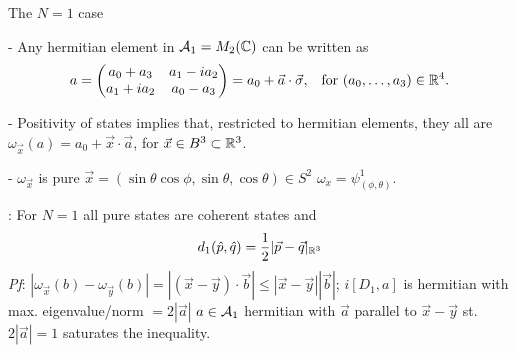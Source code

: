 \begin{frame}{The $N = 1$ case} %

- Any hermitian element in $\mathcal A_1 = M_2(\mathbb C)$ can be written as
\begin{align*}
    a &= \begin{pmatrix} a_0 + a_3 & a_1 - i a_2 \\ a_1 + i a_2 & a_0 - a_3  \end{pmatrix}= a_0 + \vec a \cdot \vec \sigma, & \text{for $(a_0, \dots, a_3) \in \mathbb R^4$.}
\end{align*}


- Positivity of states implies that, restricted to hermitian elements, they all are  $\omega_{\vec x}(a) = a_0 + \vec x \cdot \vec a$, for $\vec x \in B^3 \subset \mathbb R^3$.

- $\omega_{\vec x}$ is pure \iff $\vec x = (\sin \theta \cos \phi, \sin \theta, \cos \theta) \in S^2$ \dbtext{\iff} $\omega_x = \psi^1_{(\phi, \theta)}$.

: For $N = 1$ all pure states are coherent states and 
\begin{equation}
    d_1(\hat p, \hat q) = \frac{1}{2}|\vec p - \vec q|_{\mathbb R^3}
\end{equation}
\textit{Pf}: $|\omega_{\vec x}(b) - \omega_{\vec y}(b)| = |(\vec x - \vec y)\cdot \vec b| \leq |\vec x - \vec y||\vec b|$; $i[D_1, a]$ is hermitian with max. eigenvalue/norm $=2 |\vec a|$ \then $a \in \mathcal A_1$ hermitian with $\vec a$ parallel to $\vec x - \vec y$ st. $2|\vec a| = 1$ saturates the inequality.

\end{frame}

